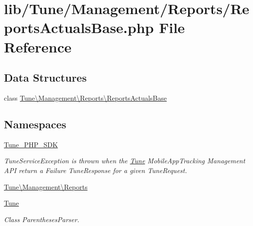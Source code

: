 \hypertarget{ReportsActualsBase_8php}{\section{lib/\-Tune/\-Management/\-Reports/\-Reports\-Actuals\-Base.php File Reference}
\label{ReportsActualsBase_8php}
}
\subsection*{Data Structures}
\begin{DoxyCompactItemize}
\item 
class \hyperlink{classTune_1_1Management_1_1Reports_1_1ReportsActualsBase}{Tune\textbackslash{}\-Management\textbackslash{}\-Reports\textbackslash{}\-Reports\-Actuals\-Base}
\end{DoxyCompactItemize}
\subsection*{Namespaces}
\begin{DoxyCompactItemize}
\item 
\hyperlink{namespaceTune__PHP__SDK}{Tune\-\_\-\-P\-H\-P\-\_\-\-S\-D\-K}
\begin{DoxyCompactList}\small\item\em Tune\-Service\-Exception is thrown when the \hyperlink{namespaceTune}{Tune} Mobile\-App\-Tracking Management A\-P\-I return a Failure Tune\-Response for a given Tune\-Request. \end{DoxyCompactList}\item 
\hyperlink{namespaceTune_1_1Management_1_1Reports}{Tune\textbackslash{}\-Management\textbackslash{}\-Reports}
\item 
\hyperlink{namespaceTune}{Tune}
\begin{DoxyCompactList}\small\item\em Class Parentheses\-Parser. \end{DoxyCompactList}\end{DoxyCompactItemize}
